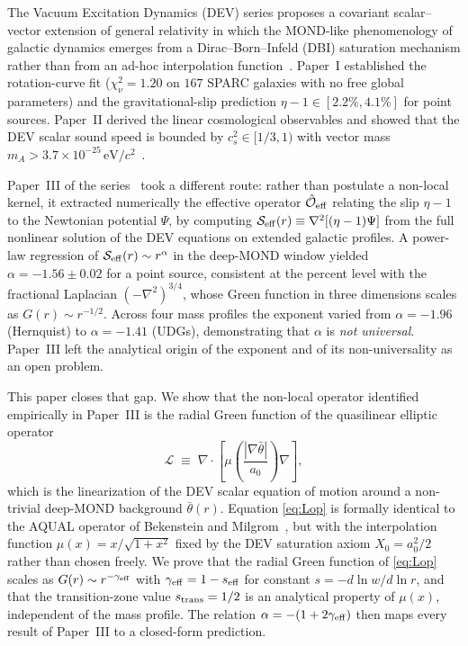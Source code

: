\documentclass[aps,prd,twocolumn,superscriptaddress,nofootinbib]{revtex4-2}
\begin{document}
The Vacuum Excitation Dynamics (DEV) series proposes a covariant
scalar--vector extension of general relativity in which the
MOND-like phenomenology of galactic dynamics emerges from a
Dirac--Born--Infeld (DBI) saturation mechanism rather than from an
ad-hoc interpolation function~\cite{PaperI,PaperII}. Paper~I
established the rotation-curve fit ($\chi^2_\nu = 1.20$ on $167$
SPARC galaxies with no free global parameters) and the
gravitational-slip prediction $\eta - 1 \in [2.2\%, 4.1\%]$ for
point sources. Paper~II derived the linear cosmological observables
and showed that the DEV scalar sound speed is bounded by
$c_s^2 \in [1/3, 1)$ with vector mass $m_A > 3.7\times 10^{-25}\,
\mathrm{eV}/c^2$~\cite{PaperII}.

Paper~III of the series~\cite{PaperIII} took a different route:
rather than postulate a non-local kernel, it extracted numerically
the effective operator $\hat{\mathcal{O}}_{\rm eff}$ relating the
slip $\eta-1$ to the Newtonian potential $\Psi$, by computing
$\mathcal{S}_{\rm eff}(r) \equiv \nabla^2[(\eta-1)\Psi]$ from the
full nonlinear solution of the DEV equations on extended
galactic profiles. A power-law regression of
$\mathcal{S}_{\rm eff}(r)\sim r^{\alpha}$ in the deep-MOND window
yielded $\alpha = -1.56 \pm 0.02$ for a point source, consistent at
the percent level with the fractional Laplacian $(-\nabla^2)^{3/4}$,
whose Green function in three dimensions scales as
$G(r)\sim r^{-1/2}$. Across four mass profiles the exponent varied
from $\alpha = -1.96$ (Hernquist) to $\alpha = -1.41$ (UDGs),
demonstrating that $\alpha$ is \emph{not universal}. Paper~III left
the analytical origin of the exponent and of its non-universality as
an open problem.

This paper closes that gap. We show that the non-local operator
identified empirically in Paper~III is the radial Green function of
the quasilinear elliptic operator
\begin{equation}
\mathcal{L} \;\equiv\; \nabla\!\cdot\!\left[\mu\!\left(
  \frac{|\nabla\bar\theta|}{a_0}\right)\nabla\right],
\label{eq:Lop}
\end{equation}
which is the linearization of the DEV scalar equation of motion
around a non-trivial deep-MOND background $\bar\theta(r)$. Equation
\eqref{eq:Lop} is formally identical to the AQUAL operator of
Bekenstein and Milgrom~\cite{BM1984}, but with the interpolation
function $\mu(x)=x/\sqrt{1+x^2}$ fixed by the DEV saturation axiom
$X_0 = a_0^2/2$ rather than chosen freely. We prove that the radial
Green function of \eqref{eq:Lop} scales as $G(r)\sim r^{-\gamma_{\rm eff}}$
with $\gamma_{\rm eff} = 1 - s_{\rm eff}$ for constant
$s = -d\ln w/d\ln r$, and that the transition-zone value
$s_{\rm trans}=1/2$ is an analytical property of $\mu(x)$,
independent of the mass profile. The relation
$\alpha = -(1+2\gamma_{\rm eff})$ then maps every result of Paper~III
to a closed-form prediction.
\end{document}
